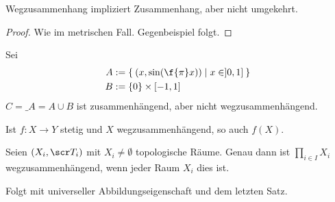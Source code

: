 \begin{st}
	Wegzusammenhang impliziert Zusammenhang, aber nicht umgekehrt.
	\begin{proof}
		Wie im metrischen Fall.
		Gegenbeispiel folgt. %
	\end{proof}
\end{st}

\begin{ex}
	Sei
	\begin{align*}
		A &:= \Set{ (x, \sin( \f {\pi}x)) | x \in ]0,1] } \\
		B &:= \{0\} \times [-1, 1]
	\end{align*}
	$C = \_A = A \cup B$ ist zusammenhängend, aber nicht wegzusammenhängend.
\end{ex}


\begin{st}
	Ist $f: X \to Y$ stetig und $X$ wegzusammenhängend, so auch $f(X)$.
\end{st}

\begin{st}
	Seien $(X_i, \scr T_i)$ mit $X_i \neq \emptyset$ topologische Räume.
	Genau dann ist $\prod_{i \in I} X_i$ wegzusammenhängend, wenn jeder Raum $X_i$ dies ist.
	\begin{st}
		Folgt mit universeller Abbildungseigenschaft und dem letzten Satz.
	\end{st}
\end{st}

